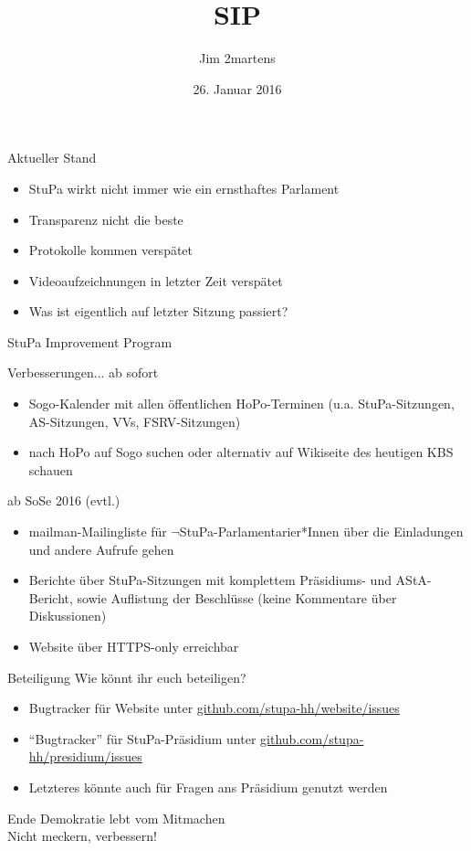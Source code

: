 \documentclass{beamer}
\begin{document}
\author{Jim 2martens}
\title{SIP}
\date{26. Januar 2016}

\begin{frame}
  \titlepage
\end{frame}

\begin{frame}{Aktueller Stand}
  \begin{itemize}
    \item StuPa wirkt nicht immer wie ein ernsthaftes Parlament
    \item Transparenz nicht die beste
    \item Protokolle kommen verspätet
    \item Videoaufzeichnungen in letzter Zeit verspätet
    \item Was ist eigentlich auf letzter Sitzung passiert?
  \end{itemize}
\end{frame}

\begin{frame}
  \centering
  StuPa Improvement Program
\end{frame}

\begin{frame}{Verbesserungen...}
  ab sofort
  \begin{itemize}
    \item Sogo-Kalender mit allen öffentlichen HoPo-Terminen (u.a. StuPa-Sitzungen, AS-Sitzungen, VVs, FSRV-Sitzungen)
    \item nach HoPo auf Sogo suchen oder alternativ auf Wikiseite des heutigen KBS schauen
  \end{itemize}
  ab SoSe 2016 (evtl.)
  \begin{itemize}
    \item mailman-Mailingliste für \( \lnot \)StuPa-Parlamentarier*Innen über die Einladungen und andere Aufrufe gehen
    \item Berichte über StuPa-Sitzungen mit komplettem Präsidiums- und AStA-Bericht, sowie Auflistung der Beschlüsse (keine Kommentare über Diskussionen)
    \item Website über HTTPS-only erreichbar
  \end{itemize}
\end{frame}

\begin{frame}{Beteiligung}
  Wie könnt ihr euch beteiligen?
  \begin{itemize}
    \item Bugtracker für Website unter \url{github.com/stupa-hh/website/issues}
    \item "`Bugtracker"' für StuPa-Präsidium unter \url{github.com/stupa-hh/presidium/issues}
    \item Letzteres könnte auch für Fragen ans Präsidium genutzt werden
  \end{itemize}
\end{frame}

\begin{frame}{Ende}
  \centering
  Demokratie lebt vom Mitmachen \\
  Nicht meckern, verbessern!
\end{frame}
\end{document}
